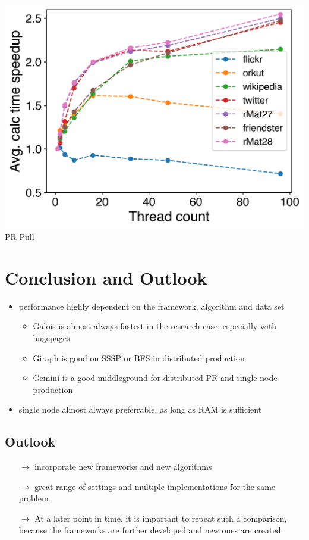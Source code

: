 \documentclass{meetings}
\begin{document}
\begin{multicols}{2}
	\includegraphics[width=0.7\linewidth]{../../plots/singleNodePRPullGaloisHPThreads.png}
	PR Pull
\end{multicols}

\section{Conclusion and Outlook}
\begin{itemize}
	\item performance highly dependent on the framework, algorithm and data set
	\begin{itemize}
		\item Galois is almost always fastest in the research case; especially with hugepages
		\item Giraph is good on SSSP or BFS in distributed production
		\item Gemini is a good middleground for distributed PR and single node production
	\end{itemize}
	
	\item single node almost always preferrable, as long as RAM is sufficient
\end{itemize}


\subsection{Outlook}
\begin{itemize}
	\item[$\rightarrow$] incorporate new frameworks and new algorithms
	\item[$\rightarrow$] great range of settings and multiple implementations for the same problem
	\item[$\rightarrow$] At a later point in time, it is important to repeat such a comparison, because the frameworks are further developed and new ones are created.
\end{itemize}
\end{document}
